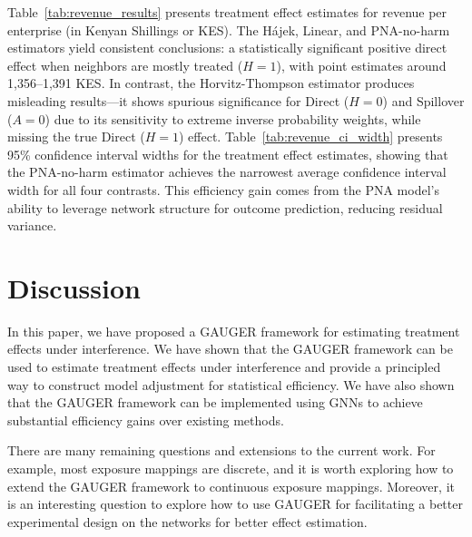 \documentclass{article}
\theoremstyle{plain}
\theoremstyle{definition}
\theoremstyle{remark}
\begin{document}
Table~\ref{tab:revenue_results} presents treatment effect estimates for revenue per enterprise (in Kenyan Shillings or KES). The H\'{a}jek, Linear, and PNA-no-harm estimators yield consistent conclusions: a statistically significant positive direct effect when neighbors are mostly treated ($H=1$), with point estimates around 1,356--1,391 KES. In contrast, the Horvitz-Thompson estimator produces misleading results---it shows spurious significance for Direct ($H=0$) and Spillover ($A=0$) due to its sensitivity to extreme inverse probability weights, while missing the true Direct ($H=1$) effect. Table~\ref{tab:revenue_ci_width} presents 95\% confidence interval widths for the treatment effect estimates, showing that the PNA-no-harm estimator achieves the narrowest average confidence interval width for all four contrasts. This efficiency gain comes from the PNA model's ability to leverage network structure for outcome prediction, reducing residual variance.




\section{Discussion}
In this paper, we have proposed a GAUGER framework for estimating treatment effects under interference. We have shown that the GAUGER framework can be used to estimate treatment effects under interference and provide a principled way to construct model adjustment for statistical efficiency. We have also shown that the GAUGER framework can be implemented using GNNs to achieve substantial efficiency gains over existing methods.

There are many remaining questions and extensions to the current work. For example, most exposure mappings are discrete, and it is worth exploring how to extend the GAUGER framework to continuous exposure mappings. Moreover, it is an interesting question to explore how to use GAUGER for facilitating a better experimental design on the networks for better effect estimation. 





\end{document}
